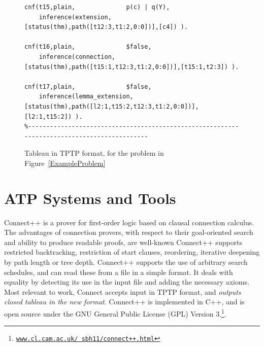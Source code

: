 \documentclass[runningheads]{llncs}
\newcommand{\smalltt}[1]{\small \texttt{#1}}
\begin{document}
{\begin{figure}[h!]
{{\begin{verbatim}
cnf(t15,plain,              p(c) | q(Y),
    inference(extension,[status(thm),path([t12:3,t1:2,0:0])],[c4]) ).

cnf(t16,plain,              $false,
    inference(connection,[status(thm),path([t15:1,t12:3,t1:2,0:0])],[t15:1,t2:3]) ).

cnf(t17,plain,              $false,
    inference(lemma_extension,[status(thm),path([l2:1,t15:2,t12:3,t1:2,0:0])],[l2:1,t15:2]) ).
%--------------------------------------------------------------------------------------------
\end{verbatim}
}}
\caption{Tableau in TPTP format, for the problem in Figure~\ref{ExampleProblem}}
\label{ExampleTableau}
\end{figure}

\section{ATP Systems and Tools}
\label{SystemsTools}

Connect++ is a prover for first-order logic based on clausal connection calculus.~\cite{Hol23} 
The advantages of connection provers, with respect to their goal-oriented search and ability to 
produce readable proofs, are well-known
Connect++ supports restricted backtracking, restriction of start clauses, reordering, iterative 
deepening by path length or tree depth.
Connect++ supports the use of arbitrary search schedules, and can read these from a file in a 
simple format.
It deals with equality by detecting its use in the input file and adding the necessary axioms.
Most relevant to work, Connect accepts input in TPTP format, and {\em outputs closed tableau in
the new format}.
Connect++ is implemented in C++, and is open source under the GNU General Public License (GPL) 
Version 3.\footnote{%
\href{https://www.cl.cam.ac.uk/~sbh11/connect++.html}{\smalltt{www.cl.cam.ac.uk/~sbh11/connect++.html}}}.

}
\end{document}
